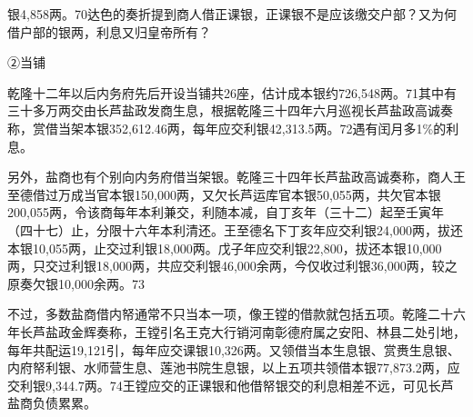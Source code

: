 \vfill
\begin{BookNotes}
\end{BookNotes}


\noindent 银4,858两。70达色的奏折提到商人借正课银，正课银不是应该缴交户部？又为何借户部的银两，利息又归皇帝所有？

②当铺

乾隆十二年以后内务府先后开设当铺共26座，估计成本银约726,548两。71其中有三十多万两交由长芦盐政发商生息，根据乾隆三十四年六月巡视长芦盐政高诚奏称，赏借当架本银352,612.46两，每年应交利银42,313.5两。72遇有闰月多1\%的利息。

另外，盐商也有个别向内务府借当架银。乾隆三十四年长芦盐政高诚奏称，商人王至德借过万成当官本银150,000两，又欠长芦运库官本银50,055两，共欠官本银200,055两，令该商每年本利兼交，利随本减，自丁亥年（三十二）起至壬寅年（四十七）止，分限十六年本利清还。王至德名下丁亥年应交利银24,000两，拔还本银10,055两，止交过利银18,000两。戊子年应交利银22,800，拔还本银10,000两，只交过利银18,000两，共应交利银46,000余两，今仅收过利银36,000两，较之原奏欠银10,000余两。73

不过，多数盐商借内帑通常不只当本一项，像王镗的借款就包括五项。乾隆二十六年长芦盐政金辉奏称，王镗引名王克大行销河南彰德府属之安阳、林县二处引地，每年共配运19,121引，每年应交课银10,326两。又领借当本生息银、赏赉生息银、内府帑利银、水师营生息、莲池书院生息银，以上五项共领借本银77,873.2两，应交利银9,344.7两。74王镗应交的正课银和他借帑银交的利息相差不远，可见长芦盐商负债累累。

\vfill
\begin{BookNotes}
\end{BookNotes}

